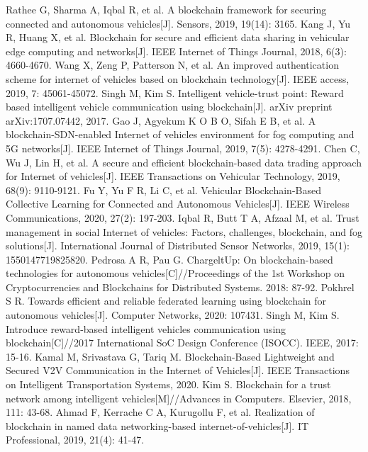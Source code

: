\begin{thebibliography}{99}
 Rathee G, Sharma A, Iqbal R, et al. A blockchain framework for securing connected and autonomous vehicles[J]. Sensors, 2019, 19(14): 3165.
 Kang J, Yu R, Huang X, et al. Blockchain for secure and efficient data sharing in vehicular edge computing and networks[J]. IEEE Internet of Things Journal, 2018, 6(3): 4660-4670.
 Wang X, Zeng P, Patterson N, et al. An improved authentication scheme for internet of vehicles based on blockchain technology[J]. IEEE access, 2019, 7: 45061-45072.
 Singh M, Kim S. Intelligent vehicle-trust point: Reward based intelligent vehicle communication using blockchain[J]. arXiv preprint arXiv:1707.07442, 2017.
 Gao J, Agyekum K O B O, Sifah E B, et al. A blockchain-SDN-enabled Internet of vehicles environment for fog computing and 5G networks[J]. IEEE Internet of Things Journal, 2019, 7(5): 4278-4291.
 Chen C, Wu J, Lin H, et al. A secure and efficient blockchain-based data trading approach for Internet of vehicles[J]. IEEE Transactions on Vehicular Technology, 2019, 68(9): 9110-9121.
 Fu Y, Yu F R, Li C, et al. Vehicular Blockchain-Based Collective Learning for Connected and Autonomous Vehicles[J]. IEEE Wireless Communications, 2020, 27(2): 197-203.
 Iqbal R, Butt T A, Afzaal M, et al. Trust management in social Internet of vehicles: Factors, challenges, blockchain, and fog solutions[J]. International Journal of Distributed Sensor Networks, 2019, 15(1): 1550147719825820.
 Pedrosa A R, Pau G. ChargeltUp: On blockchain-based technologies for autonomous vehicles[C]//Proceedings of the 1st Workshop on Cryptocurrencies and Blockchains for Distributed Systems. 2018: 87-92.
 Pokhrel S R. Towards efficient and reliable federated learning using blockchain for autonomous vehicles[J]. Computer Networks, 2020: 107431.
 Singh M, Kim S. Introduce reward-based intelligent vehicles communication using blockchain[C]//2017 International SoC Design Conference (ISOCC). IEEE, 2017: 15-16.
 Kamal M, Srivastava G, Tariq M. Blockchain-Based Lightweight and Secured V2V Communication in the Internet of Vehicles[J]. IEEE Transactions on Intelligent Transportation Systems, 2020.
 Kim S. Blockchain for a trust network among intelligent vehicles[M]//Advances in Computers. Elsevier, 2018, 111: 43-68.
 Ahmad F, Kerrache C A, Kurugollu F, et al. Realization of blockchain in named data networking-based internet-of-vehicles[J]. IT Professional, 2019, 21(4): 41-47.

\end{thebibliography}

